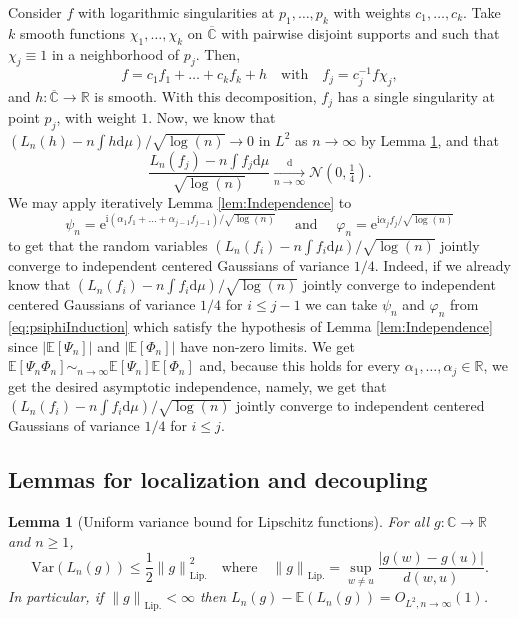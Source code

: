 \documentclass[10pt,reqno]{amsart}
\numberwithin{equation}{section}
\numberwithin{figure}{section}
\theoremstyle{plain}
\newtheorem{lemma}[theorem]{Lemma}
\newcommand{\<}{\langle}
\renewcommand{\>}{\rangle}
\begin{document}
Consider $f$ with logarithmic singularities at $p_1,\ldots,p_k$ with weights $c_1,\ldots,c_k$. Take $k$ smooth functions $\chi_1,\ldots,\chi_k$ on $\overline{\mathbb{C}}$ with pairwise disjoint supports and such that $\chi_j\equiv 1$ in a neighborhood of $p_j$. Then,
\begin{equation}
f = c_1 f_1 + \dots + c_k f_k + h \quad \text{with}\quad 
f_j =c_j^{-1} f \chi_j,
\end{equation}
and $h:\overline{\mathbb{C}}\to\mathbb{R}$ is smooth. With this decomposition, $f_j$ has a single singularity at point $p_j$, with weight $1$. Now, we know that $(L_n(h)-n \int h \mathrm d \mu)/\sqrt{\log(n)}\to0$ in $L^2$ as $n\to\infty$ by Lemma \ref{lem:lip-variance}, and that
\begin{equation}
\frac{L_n(f_j)-n\int f_j \mathrm{d}\mu}{\sqrt{\log(n)}}
\xrightarrow[n\to\infty]{\mathrm{d}}\mathcal{N}(0,\tfrac{1}{4}).
\end{equation}
We may apply iteratively Lemma \ref{lem:Independence} to %
\begin{equation}
\label{eq:psiphiInduction}
\psi_n = \mathrm{e}^{\mathrm{i}(\alpha_1 f_1+\dots+\alpha_{j-1}f_{j-1})/\sqrt{\log(n)}}
\quad \mbox{ and } 
\quad \varphi_n =\mathrm{e}^{\mathrm{i}\alpha_{j} f_{j}/\sqrt{\log(n)}}
\end{equation}
to get that the random variables
$(L_n(f_i)-n\int f_i\mathrm{d}\mu)/\sqrt{\log(n)}$ jointly converge to independent centered Gaussians of variance $1/4$. 
Indeed, 
if we already know that
$(L_n(f_i)-n\int f_i\mathrm{d}\mu)/\sqrt{\log(n)}$ jointly converge to 
independent centered Gaussians of variance $1/4$
for $i \leq j-1$ we can take
$\psi_n$ and $\varphi_n$ from
\eqref{eq:psiphiInduction}
which satisfy the hypothesis
of Lemma 
\ref{lem:Independence}
since $|\mathbb E[\Psi_n]|$ and $|\mathbb E[\Phi_n]|$
have non-zero limits. 
We get
$\mathbb E[\Psi_n \Phi_n] \sim_{n \to \infty}
\mathbb E[\Psi_n] \mathbb E[\Phi_n]$
and, because this holds for every $\alpha_1,\dots,\alpha_j
\in \mathbb R$,
we get the desired 
asymptotic independence, namely, we get that
$(L_n(f_i)-n\int f_i\mathrm{d}\mu)/\sqrt{\log(n)}$ jointly converge to 
independent centered Gaussians of variance $1/4$
for $i \leq j$.

\subsection{Lemmas for localization and decoupling}
\label{se:lemmas}

\begin{lemma}[Uniform variance bound for Lipschitz functions]\label{lem:lip-variance}
  For all $g:\mathbb{C}\to\mathbb{R}$ and $n\geq1$,
  \begin{equation}
    \mathrm{Var}(L_n(g))\leq \frac{1}{2}{\|g\|}_{\mathrm{Lip.}}^2
    \quad\text{where}\quad
    {\|g\|}_{\mathrm{Lip.}}=\sup_{w\neq u}\frac{|g(w)-g(u)|}{d(w,u)}.
  \end{equation}
  In particular, if ${\|g\|}_{\mathrm{Lip.}}<\infty$ then $L_n(g)-\mathbb{E}(L_n(g))=O_{L^2,n\to\infty}(1)$.
\end{lemma}
\end{document}
